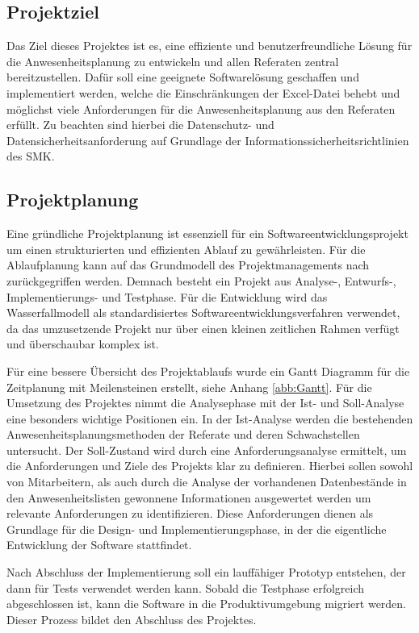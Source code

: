 \subsection{Projektziel}
\label{sec:Projektziel}

Das Ziel dieses Projektes ist es, eine effiziente und benutzerfreundliche Lösung für die Anwesenheitsplanung zu entwickeln und allen Referaten zentral bereitzustellen. Dafür soll eine geeignete Softwarelösung geschaffen und implementiert werden, welche die Einschränkungen der Excel-Datei behebt und möglichst viele Anforderungen für die Anwesenheitsplanung aus den Referaten erfüllt. Zu beachten sind hierbei die Datenschutz- und Datensicherheitsanforderung auf Grundlage der Informationssicherheitsrichtlinien des SMK.

\subsection{Projektplanung}
\label{sec:Projektplanung}

Eine gründliche Projektplanung ist essenziell für ein Softwareentwicklungsprojekt um einen strukturierten und effizienten Ablauf zu gewährleisten. Für die Ablaufplanung kann auf das Grundmodell des Projektmanagements nach \cite[S.225]{dehler-2013} zurückgegriffen werden. Demnach besteht ein Projekt aus Analyse-, Entwurfs-, Implementierungs- und Testphase. Für die Entwicklung wird das Wasserfallmodell als standardisiertes Softwareentwicklungsverfahren verwendet, da das umzusetzende Projekt nur über einen kleinen zeitlichen Rahmen verfügt und überschaubar komplex ist.

Für eine bessere Übersicht des Projektablaufs wurde ein Gantt Diagramm für die Zeitplanung mit Meilensteinen erstellt, siehe Anhang \ref{abb:Gantt}. Für die Umsetzung des Projektes nimmt die Analysephase mit der Ist- und Soll-Analyse eine besonders wichtige Positionen ein. In der Ist-Analyse werden die bestehenden Anwesenheitsplanungsmethoden der Referate und deren Schwachstellen untersucht. Der Soll-Zustand wird durch eine Anforderungsanalyse ermittelt, um die Anforderungen und Ziele des Projekts klar zu definieren. Hierbei sollen sowohl von Mitarbeitern, als auch durch die Analyse der vorhandenen Datenbestände in den Anwesenheitslisten gewonnene Informationen ausgewertet werden um relevante Anforderungen zu identifizieren. Diese Anforderungen dienen als Grundlage für die Design- und Implementierungsphase, in der die eigentliche Entwicklung der Software stattfindet.

Nach Abschluss der Implementierung soll ein lauffähiger Prototyp entstehen, der dann für Tests verwendet werden kann. Sobald die Testphase erfolgreich abgeschlossen ist, kann die Software in die Produktivumgebung migriert werden. Dieser Prozess bildet den Abschluss des Projektes.


